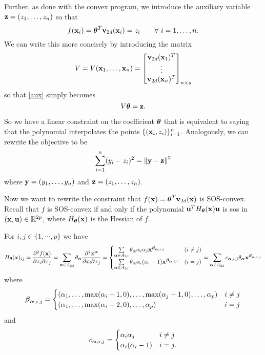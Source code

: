 \documentclass[11pt]{article}
\begin{document}
Further, as done with the convex program, we introduce the auxiliary variable ${\bf z} = (z_1, \dotsc, z_n)$ so that 
\begin{equation}\label{aux}
f({\bf x}_i) = {\boldsymbol\theta}^T{\bf v}_{2d}({\bf x}_i) = z_i \qquad\forall\ i = 1, \dotsc, n.
\end{equation}
We can write this more concisely by introducing the matrix
\[
V = V({\bf x}_1, \dotsc, {\bf x}_n) = \begin{bmatrix}
{\bf v}_{2d}({\bf x}_1)^T \\
\vdots \\
{\bf v}_{2d}({\bf x}_n)^T
\end{bmatrix}_{n \times s}
\]
so that \eqref{aux} simply becomes
\begin{equation}\label{sos-poly}
V{\boldsymbol\theta} = {\bf z}.
\end{equation}

So we have a linear constraint on the coefficient ${\boldsymbol\theta}$ that is equivalent to saying that the polynomial interpolates the points $\{({\bf x}_i, z_i)\}_{i=1}^n$. Analogously, we can rewrite the objective to be
\begin{equation}\label{sos-reg-obj2}
\sum_{i=1}^n(y_i - z_i)^2 = \left\lVert {\bf y} - {\bf z} \right\rVert^2
\end{equation}
where ${\bf y} = (y_1, \dotsc, y_n)$ and ${\bf z} = (z_1, \dotsc, z_n)$.


Now we want to rewrite the constraint that $f({\bf x}) = {\boldsymbol\theta}^T{\bf v}_{2d}({\bf x})$ is SOS-convex. Recall that $f$ is SOS-convex if and only if the polynomial ${\bf u}^TH_{\boldsymbol\theta}({\bf x}){\bf u}$ is sos in $({\bf x}, {\bf u}) \in \mathbb R^{2p}$, where $H_{\boldsymbol\theta}({\bf x})$ is the Hessian of $f$.

For $i, j\in\{1, \cdots, p\}$ we have
\begin{equation} \label{hessian}
H_{\boldsymbol\theta}({\bf x})_{ij} = \frac{\partial^2 f({\bf x})}{\partial x_i \partial x_j}  = \sum_{{\boldsymbol\alpha} \in A_{2d} } \theta_{\boldsymbol\alpha} \frac{\partial^2 {\bf x}^{\boldsymbol\alpha}}{\partial x_i \partial x_j} = 
\begin{cases}
\sum\limits_{{\boldsymbol\alpha} \in A_{2d} } \theta_{\boldsymbol\alpha} \alpha_i \alpha_j {\bf x}^{{\boldsymbol\beta}_{{\boldsymbol\alpha}, i,j}} & (i \not= j)\\
\sum\limits_{{\boldsymbol\alpha} \in A_{2d}} \theta_{\boldsymbol\alpha} \alpha_i (\alpha_i-1) {\bf x}^{{\boldsymbol\beta}_{{\boldsymbol\alpha}, i,i}} & (i = j)
\end{cases}
= \sum_{{\boldsymbol\alpha} \in A_{2d} } c_{{\boldsymbol\alpha}, i, j} \theta_{\boldsymbol\alpha}  {\bf x}^{{\boldsymbol\beta}_{{\boldsymbol\alpha}, i,j}}
\end{equation}
where
\begin{equation}\notag
{\boldsymbol\beta}_{{\boldsymbol\alpha}, i,j} =
\begin{cases}
 (\alpha_1, \dotsc, \max(\alpha_i-1, 0), \dotsc, \max(\alpha_j-1, 0), \dotsc, \alpha_p) & i \neq j\\
(\alpha_1, \dotsc, \max(\alpha_i-2, 0), \dotsc, \alpha_p) & i = j
\end{cases}
\end{equation}
and
\begin{equation}\notag
c_{{\boldsymbol\alpha}, i, j} =
\begin{cases}
\alpha_i \alpha_j  & i \not= j\\
\alpha_i (\alpha_i - 1)  & i = j.
\end{cases}
\end{equation}
\end{document}
